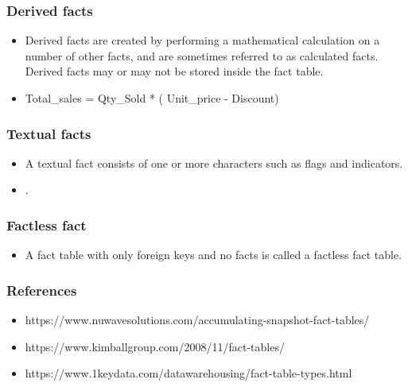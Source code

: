 \begin{frame}
    \frametitle{Derived facts}
    
    \begin{itemize}
        \item Derived facts are created by performing a mathematical calculation
        on a number of other facts, and are sometimes referred to as
        calculated facts. Derived facts may or may not be stored inside the
        fact table.
        \item Total\_sales = Qty\_Sold * ( Unit\_price - Discount)
    \end{itemize}

    \centering
    


\end{frame}
\begin{frame}
    \frametitle{Textual facts}
    \begin{itemize}
        \item A textual fact consists of one or more characters such as flags and indicators.
        \item {}.
    \end{itemize}
    
\end{frame}
\begin{frame}
\frametitle{Factless fact}
    \begin{itemize}
        \item A fact table with only foreign keys and no facts is called a factless
        fact table.
    \end{itemize}
\end{frame}
\begin{frame}
    \frametitle{References}
        \begin{itemize}
            \item https://www.nuwavesolutions.com/accumulating-snapshot-fact-tables/
            \item https://www.kimballgroup.com/2008/11/fact-tables/
            \item https://www.1keydata.com/datawarehousing/fact-table-types.html
        \end{itemize}
\end{frame}


